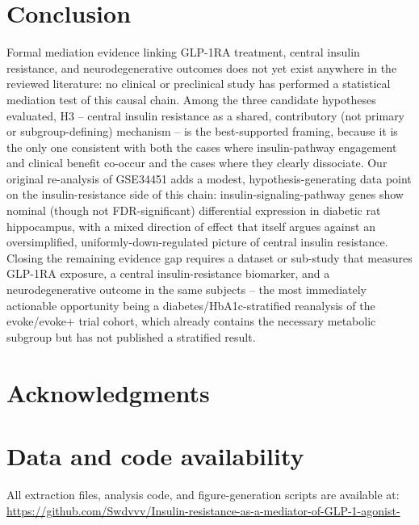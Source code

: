 \documentclass[11pt, a4paper]{article}
\begin{document}
\section{Conclusion}
\label{sec:conclusion}
Formal mediation evidence linking GLP-1RA treatment, central insulin
resistance, and neurodegenerative outcomes does not yet exist anywhere in
the reviewed literature: no clinical or preclinical study has performed a
statistical mediation test of this causal chain. Among the three candidate
hypotheses evaluated, H3 -- central insulin resistance as a shared,
contributory (not primary or subgroup-defining) mechanism -- is the
best-supported framing, because it is the only one consistent with both the
cases where insulin-pathway engagement and clinical benefit co-occur and the
cases where they clearly dissociate. Our original re-analysis of GSE34451
adds a modest, hypothesis-generating data point on the insulin-resistance
side of this chain: insulin-signaling-pathway genes show nominal (though not
FDR-significant) differential expression in diabetic rat hippocampus, with
a mixed direction of effect that itself argues against an oversimplified,
uniformly-down-regulated picture of central insulin resistance. Closing the
remaining evidence gap requires a dataset or sub-study that measures GLP-1RA
exposure, a central insulin-resistance biomarker, and a neurodegenerative
outcome in the same subjects -- the most immediately actionable opportunity
being a diabetes/HbA1c-stratified reanalysis of the evoke/evoke+ trial
cohort, which already contains the necessary metabolic subgroup but has not
published a stratified result.

\section*{Acknowledgments}

\section*{Data and code availability}
All extraction files, analysis code, and figure-generation scripts are
available at: \url{https://github.com/Swdvvv/Insulin-resistance-as-a-mediator-of-GLP-1-agonist-}
\end{document}
